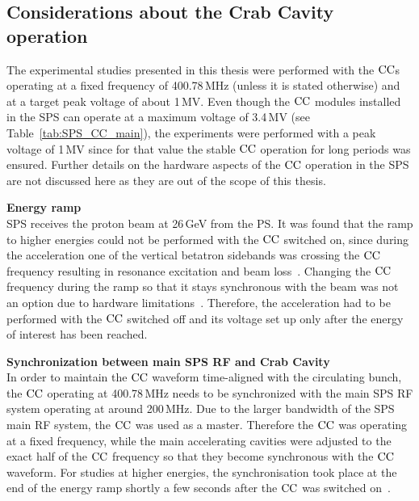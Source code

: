  
\subsection{Considerations about the Crab Cavity operation}\label{sec:cc_setup}
The experimental studies presented in this thesis were performed with the ${\mathrm{CC}}$s operating at a fixed frequency of 400.78\,MHz (unless it is stated otherwise) and at a target peak voltage of about 1\,MV. %
Even though the ${\mathrm{CC}}$ modules installed in the SPS can operate at a maximum voltage of 3.4\,MV (see Table~\ref{tab:SPS_CC_main}), the experiments were performed with a peak voltage of 1\,MV since for that value the stable ${\mathrm{CC}}$ operation for long periods was ensured. Further details on the hardware aspects of the ${\mathrm{CC}}$ operation in the SPS are not discussed here as they are out of the scope of this thesis.

\normalsize{\textbf{Energy ramp}}\\
SPS receives the proton beam at 26\,GeV from the PS. It was found that the ramp to higher energies could not be performed with the ${\mathrm{CC}}$ switched on, since during the acceleration one of the vertical betatron sidebands was crossing the ${\mathrm{CC}}$ frequency resulting in resonance excitation and beam loss~\cite{BE_seminar, CC_rephasing_RF}. Changing the ${\mathrm{CC}}$ frequency during the ramp so that it stays synchronous with the beam was not an option due to hardware limitations~\cite{CC_rephasing_RF}. %
Therefore, the acceleration had to be performed with the ${\mathrm{CC}}$ switched off and its voltage set up only after the energy of interest has been reached. %

\normalsize{\textbf{Synchronization between main SPS RF and Crab Cavity}}\\
In order to maintain the ${\mathrm{CC}}$ waveform time-aligned with the circulating bunch, the ${\mathrm{CC}}$ operating at 400.78\,MHz needs to be synchronized with the main SPS RF system operating at around 200\,MHz. Due to the larger bandwidth of the SPS main RF system, the ${\mathrm{CC}}$ was used as a master. Therefore the ${\mathrm{CC}}$ was operating at a fixed frequency, while the main accelerating cavities were adjusted to the exact half of the ${\mathrm{CC}}$ frequency so that they become synchronous with the ${\mathrm{CC}}$ waveform. For studies at higher energies, the synchronisation took place at the end of the energy ramp shortly a few seconds after the ${\mathrm{CC}}$ was switched on~\cite{BE_seminar}. %


